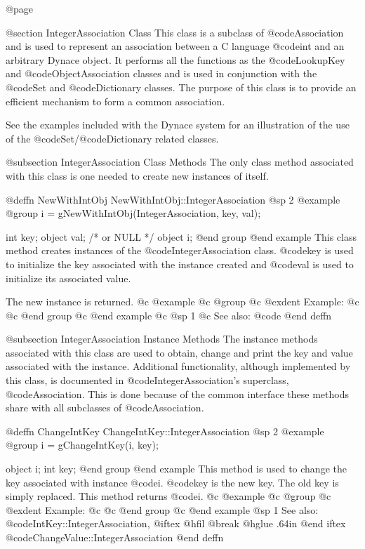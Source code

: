 @page

@section IntegerAssociation Class
This class is a subclass of @code{Association} and is used to represent
an association between a C language @code{int} and an arbitrary Dynace
object.  It performs all the functions as the @code{LookupKey} and
@code{ObjectAssociation} classes and is used in conjunction with the
@code{Set} and @code{Dictionary} classes.  The purpose of this class is
to provide an efficient mechanism to form a common association.


See the examples included with the Dynace system for an illustration of the
use of the @code{Set}/@code{Dictionary} related classes.

@subsection IntegerAssociation Class Methods
The only class method associated with this class is one needed to create
new instances of itself.






@deffn {NewWithIntObj} NewWithIntObj::IntegerAssociation
@sp 2
@example
@group
i = gNewWithIntObj(IntegerAssociation, key, val);

int     key;
object  val;    /*  or NULL   */
object  i;
@end group
@end example
This class method creates instances of the @code{IntegerAssociation}
class.  @code{key} is used to initialize the key associated with the
instance created and @code{val} is used to initialize its associated
value.

The new instance is returned.
@c @example
@c @group
@c @exdent Example:
@c 
@c @end group
@c @end example
@c @sp 1
@c See also:  @code{}
@end deffn



@subsection IntegerAssociation Instance Methods
The instance methods associated with this class are used to obtain,
change and print the key and value associated with the instance.
Additional functionality, although implemented by this class, is documented
in @code{IntegerAssociation}'s superclass, @code{Association}.  This is done
because of the common interface these methods share with all subclasses
of @code{Association}.












@deffn {ChangeIntKey} ChangeIntKey::IntegerAssociation
@sp 2
@example
@group
i = gChangeIntKey(i, key);

object  i;
int     key;
@end group
@end example
This method is used to change the key associated with instance @code{i}.
@code{key} is the new key.  The old key is simply replaced.  This method
returns @code{i}.
@c @example
@c @group
@c @exdent Example:
@c 
@c @end group
@c @end example
@sp 1
See also:  @code{IntKey::IntegerAssociation,}
@iftex
@hfil @break @hglue .64in      
@end iftex
@code{ChangeValue::IntegerAssociation}
@end deffn











